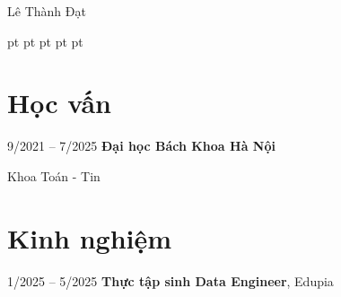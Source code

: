     \begin{header}
        \fontsize{25 pt}{25 pt}\selectfont Lê Thành Đạt

        \vspace{5 pt}

        \normalsize
         pt%
        \mbox{}%
         pt%
        \AND%
         pt%
        \mbox{}%
         pt%
        \AND%
         pt%
        \mbox{}%
    \end{header}

    \vspace{5 pt - 0.3 cm}

\section{Học vấn}
    \begin{twocolentry}{9/2021 – 7/2025}
        \textbf{Đại học Bách Khoa Hà Nội}\end{twocolentry}
    \vspace{0.10 cm}
    \begin{onecolentry}
            Khoa Toán - Tin 
    \end{onecolentry}

\section{Kinh nghiệm}
    \begin{twocolentry}{1/2025 – 5/2025}
        \textbf{Thực tập sinh Data Engineer}, Edupia
    \end{twocolentry}
\vspace{0.10 cm}
    
